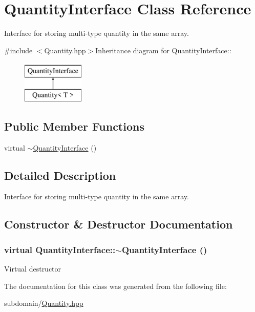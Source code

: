 \hypertarget{classQuantityInterface}{
\section{QuantityInterface Class Reference}
\label{classQuantityInterface}
}


Interface for storing multi-\/type quantity in the same array.  


{\ttfamily \#include $<$Quantity.hpp$>$}Inheritance diagram for QuantityInterface::\begin{figure}[H]
\begin{center}
\leavevmode
\includegraphics[height=2cm]{classQuantityInterface}
\end{center}
\end{figure}
\subsection*{Public Member Functions}
\begin{DoxyCompactItemize}
\item 
virtual \hyperlink{classQuantityInterface_acb39ddd398f6d615f28051bb32c25bbe}{$\sim$QuantityInterface} ()
\end{DoxyCompactItemize}


\subsection{Detailed Description}
Interface for storing multi-\/type quantity in the same array. 

\subsection{Constructor \& Destructor Documentation}
\hypertarget{classQuantityInterface_acb39ddd398f6d615f28051bb32c25bbe}{
\subsubsection[{$\sim$QuantityInterface}]{\setlength{\rightskip}{0pt plus 5cm}virtual QuantityInterface::$\sim$QuantityInterface ()}}
\label{classQuantityInterface_acb39ddd398f6d615f28051bb32c25bbe}
Virtual destructor 

The documentation for this class was generated from the following file:\begin{DoxyCompactItemize}
\item 
subdomain/\hyperlink{Quantity_8hpp}{Quantity.hpp}\end{DoxyCompactItemize}
